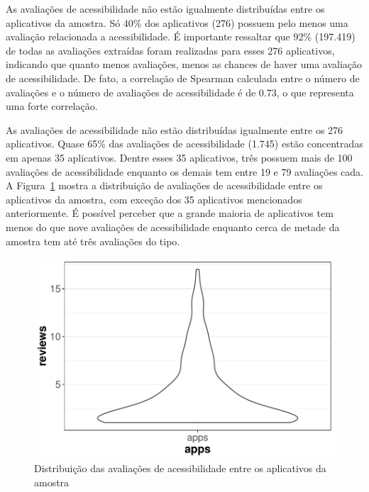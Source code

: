 As avaliações de acessibilidade não estão igualmente distribuídas entre os aplicativos da amostra.
Só 40\% dos aplicativos (276) possuem pelo menos uma avaliação relacionada a acessibilidade.
É importante ressaltar que 92\% (197.419) de todas as avaliações extraídas foram realizadas para esses 276 aplicativos, indicando que quanto menos avaliações, menos as chances de haver uma avaliação de acessibilidade. 
De fato, a correlação de Spearman calculada entre o número de avaliações e o número de avaliações de acessibilidade é de 0.73, o que representa uma forte correlação.

As avaliações de acessibilidade não estão distribuídas igualmente entre os 276 aplicativos.
Quase 65\% das avaliações de acessibilidade (1.745) estão concentradas em apenas 35 aplicativos. 
Dentre esses 35 aplicativos, três possuem mais de 100 avaliações de acessibilidade enquanto os demais tem entre 19 e 79 avaliações cada. 
A Figura~\ref{fig:distributionreviewsapp} mostra a distribuição de avaliações de acessibilidade entre os aplicativos da amostra, com exceção dos 35 aplicativos mencionados anteriormente.
É possível perceber que a grande maioria de aplicativos tem menos do que nove avaliações de acessibilidade enquanto cerca de metade da amostra tem até três avaliações do tipo.


\begin{figure}[!htb]
\centering
\includegraphics[scale=0.80]{imagens/distribution-accreviews-no-outlier-violin.pdf}
\caption{Distribuição das avaliações de acessibilidade entre os aplicativos da amostra}
\label{fig:distributionreviewsapp}
\end{figure}


